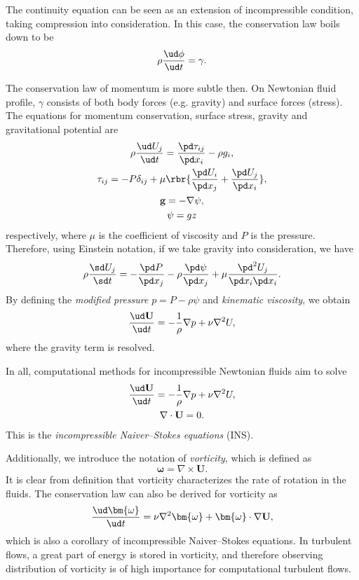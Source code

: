 \documentclass[english, nochinese]{pkupaper}
\begin{document}
The continuity equation can be seen as an extension of incompressible condition, taking compression into consideration. In this case, the conservation law boils down to be
\begin{equation}
\rho \frac{ \ud \phi }{ \ud t } = \gamma.
\end{equation}

The conservation law of momentum is more subtle then. On Newtonian fluid profile, $\gamma$ consists of both body forces (e.g. gravity) and surface forces (stress). The equations for momentum conservation, surface stress, gravity and gravitational potential are
\begin{gather}
\rho \frac{ \ud U_j }{ \ud t } = \frac{ \pd \tau_{ i j } }{ \pd x_i } - \rho g_i, \\
\tau_{ i j } = - P \delta_{ i j } + \mu \rbr{ \frac{ \pd U_i }{ \pd x_j } + \frac{ \pd U_j }{ \pd x_i } }, \\
\mathbf{g} = -\nabla \psi, \\
\psi = g z 
\end{gather}
respectively, where $\mu$ is the coefficient of viscosity and $P$ is the pressure. Therefore, using Einstein notation, if we take gravity into consideration, we have
\begin{equation}
\rho \frac{ \sd U_j }{ \sd t } = - \frac{ \pd P }{ \pd x_j } - \rho \frac{ \pd \psi }{ \pd x_j } + \mu \frac{ \pd^2 U_j }{ \pd x_i \pd x_i }.
\end{equation}
By defining the \emph{modified pressure} $ p = P - \rho \psi $ and \emph{kinematic viscosity}, we obtain
\begin{equation}
\frac{ \ud \mathbf{U} }{ \ud t } = -\frac{1}{\rho} \nabla p + \nu \nabla^2 U,
\end{equation}
where the gravity term is resolved.

In all, computational methods for incompressible Newtonian fluids aim to solve
\begin{equation} \label{Eq:INS}
\begin{gathered}
\frac{ \ud \mathbf{U} }{ \ud t } =  - \frac{1}{\rho} \nabla p + \nu \nabla^2 U, \\
\nabla \cdot \mathbf{U} = 0.
\end{gathered}
\end{equation}
This is the \emph{incompressible Naiver--Stokes equations} (INS).

Additionally, we introduce the notation of \emph{vorticity}, which is defined as
\begin{equation}
\bm{\omega} = \nabla \times \mathbf{U}.
\end{equation}
It is clear from definition that vorticity characterizes the rate of rotation in the fluids. The conservation law can also be derived for vorticity as
\begin{equation}
\frac{ \ud \bm{\omega} }{ \ud t } = \nu \nabla^2 \bm{\omega} + \bm{\omega} \cdot \nabla \mathbf{U},
\end{equation}
which is also a corollary of incompressible Naiver--Stokes equations. In turbulent flows, a great part of energy is stored in vorticity, and therefore observing distribution of vorticity is of high importance for computational turbulent flows.
\end{document}
